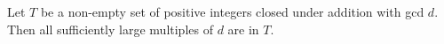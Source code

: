 Let $T$ be a non-empty set of positive integers closed under addition with gcd $d$. Then all sufficiently large multiples of $d$ are in $T$.
